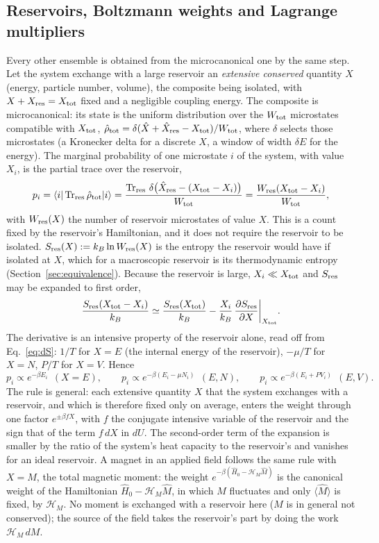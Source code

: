 \documentclass[10pt,a4paper]{article}
\theoremstyle{remark}
\newcommand{\Tr}{\operatorname{Tr}}
\newcommand{\hmag}{\mathcal{H}_M}
\begin{document}
\subsection{Reservoirs, Boltzmann weights and Lagrange multipliers}
\label{sec:reservoir}
Every other ensemble is obtained from the microcanonical one by the same step.
Let the system exchange with a large reservoir an \emph{extensive conserved}
quantity $X$ (energy, particle number, volume), the composite being isolated,
with $X+X_{\rm res}=X_{\rm tot}$ fixed and a negligible coupling energy. The
composite is microcanonical: its state is the uniform distribution over the
$W_{\rm tot}$ microstates compatible with $X_{\rm tot}$,
$\hat\rho_{\rm tot}=\delta(\hat X+\hat X_{\rm res}-X_{\rm tot})/W_{\rm tot}$,
where $\delta$ selects those microstates (a Kronecker delta for a discrete
$X$, a window of width $\delta E$ for the energy). The marginal probability of
one microstate $i$ of the system, with value $X_i$, is the partial trace over
the reservoir,
\[
  p_i=\langle i|\Tr_{\rm res}\hat\rho_{\rm tot}|i\rangle
  =\frac{\Tr_{\rm res}\,\delta\big(\hat X_{\rm res}-(X_{\rm tot}-X_i)\big)}{W_{\rm tot}}
  =\frac{W_{\rm res}(X_{\rm tot}-X_i)}{W_{\rm tot}} ,
\]
with $W_{\rm res}(X)$ the number of reservoir microstates of value $X$. This
is a count fixed by the reservoir's Hamiltonian, and it does not require the
reservoir to be isolated. $S_{\rm res}(X):=k_B\ln W_{\rm res}(X)$ is the
entropy the reservoir would have if isolated at $X$, which for a macroscopic
reservoir is its thermodynamic entropy (Section~\ref{sec:equivalence}).
Because the reservoir is large, $X_i\ll X_{\rm tot}$ and $S_{\rm res}$ may be
expanded to first order,
\[
  \frac{S_{\rm res}(X_{\rm tot}-X_i)}{k_B}\simeq\frac{S_{\rm res}(X_{\rm tot})}{k_B}
  -\frac{X_i}{k_B}\,\frac{\partial S_{\rm res}}{\partial X}\bigg|_{X_{\rm tot}} .
\]
The derivative is an intensive property of the reservoir alone, read off from
Eq.~\eqref{eq:dS}: $1/T$ for $X=E$ (the internal energy of the reservoir),
$-\mu/T$ for $X=N$, $P/T$ for $X=V$. Hence
\begin{equation}\label{eq:weights}
  p_i\propto e^{-\beta E_i}\ \ (X=E),\qquad
  p_i\propto e^{-\beta(E_i-\mu N_i)}\ \ (E,N),\qquad
  p_i\propto e^{-\beta(E_i+PV_i)}\ \ (E,V) .
\end{equation}
The rule is general: each extensive quantity $X$ that the system exchanges
with a reservoir, and which is therefore fixed only on average, enters the
weight through one factor $e^{\pm\beta fX}$, with $f$ the conjugate intensive
variable of the reservoir and the sign that of the term $f\,dX$ in $dU$. The
second-order term of the expansion is smaller by the ratio of the system's
heat capacity to the reservoir's and vanishes for an ideal reservoir. A magnet
in an applied field follows the same rule with $X=M$, the total magnetic
moment: the weight $e^{-\beta(\hat H_0-\hmag{}\hat M)}$ is the canonical
weight of the Hamiltonian $\hat H_0-\hmag{}\hat M$, in which $M$
fluctuates and only $\langle\hat M\rangle$ is fixed, by $\hmag{}$. No
moment is exchanged with a reservoir here ($M$ is in general not conserved);
the source of the field takes the reservoir's part by doing the work
$\hmag{}\,dM$.
\end{document}
